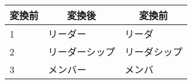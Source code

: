%
\begin{table}[!tbp]
\begin{center}
\begin{tabular}{lll}
\toprule
\multicolumn{1}{l}{変換前}&\multicolumn{1}{c}{変換後}&\multicolumn{1}{c}{変換前}\tabularnewline
\midrule
1&リーダー&リーダ\tabularnewline
2&リーダーシップ&リーダシップ\tabularnewline
3&メンバー&メンバ\tabularnewline
\bottomrule
\end{tabular}
\end{center}
\end{table}

